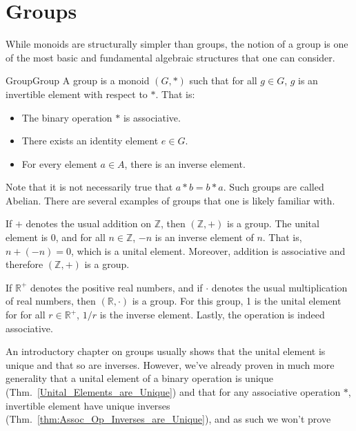 \section{Groups}
    While monoids are structurally simpler than groups, the notion of a group is
    one of the most basic and fundamental algebraic structures that one can
    consider.
    \begin{fdefinition}{Group}{Group}
        A group is a \gls{monoid} $(G,*)$ such that for all $g\in{G}$, $g$ is an
        \gls{invertible element} with respect to $*$. That is:
        \begin{itemize}
            \item The binary operation $*$ is associative.
            \item There exists an identity element $e\in{G}$.
            \item For every element $a\in{A}$, there is an inverse element.
        \end{itemize}
    \end{fdefinition}
    Note that it is not necessarily true that $a*b=b*a$. Such groups are called
    Abelian. There are several examples of groups that one is likely familiar
    with.
    \begin{example}
        If $+$ denotes the usual addition on $\mathbb{Z}$, then
        $(\mathbb{Z},+)$ is a group. The unital element is 0, and for all
        $n\in\mathbb{Z}$, $\minus{n}$ is an inverse element of $n$. That is,
        $n+(\minus{n})=0$, which is a unital element. Moreover, addition is
        associative and therefore $(\mathbb{Z},+)$ is a group.
    \end{example}
    \begin{example}
        If $\mathbb{R}^{+}$ denotes the positive real numbers, and if $\cdot$
        denotes the usual multiplication of real numbers, then
        $(\mathbb{R},\cdot)$ is a group. For this group, 1 is the unital element
        for for all $r\in\mathbb{R}^{+}$, $1/r$ is the inverse element. Lastly,
        the operation is indeed associative.
    \end{example}
    An introductory chapter on groups usually shows that the unital
    element is unique and that so are inverses. However, we've already proven in
    much more generality that a unital element of a binary operation is
    unique (Thm.~\ref{Unital_Elements_are_Unique}) and that for any associative
    operation $*$, invertible element have unique inverses
    (Thm.~\ref{thm:Assoc_Op_Inverses_are_Unique}), and as such we won't prove
